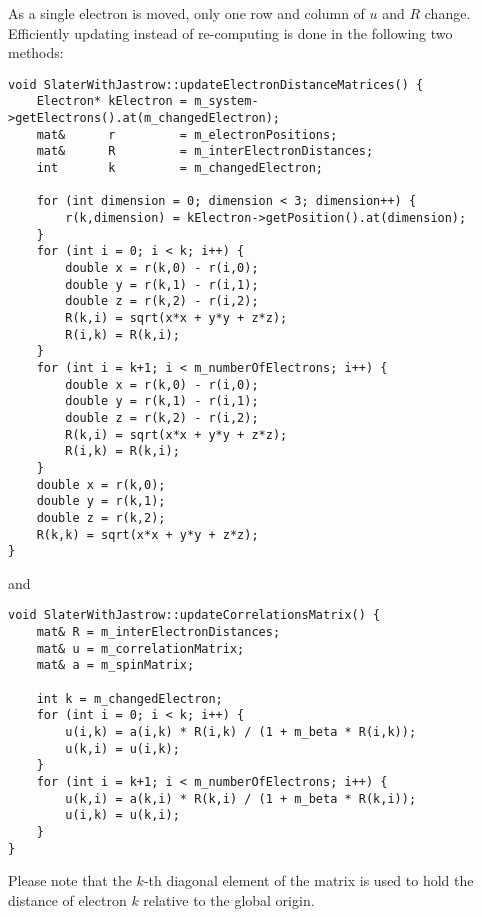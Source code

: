 \documentclass[../../master.tex]{subfiles}
\begin{document}
As a single electron is moved, only one row and column of $u$ and $R$ change. Efficiently updating instead of re-computing is done in the following two  methods:
\begin{lstlisting}[language={[std]c++}]
void SlaterWithJastrow::updateElectronDistanceMatrices() {
    Electron* kElectron = m_system->getElectrons().at(m_changedElectron);
    mat&      r         = m_electronPositions;
    mat&      R         = m_interElectronDistances;
    int       k         = m_changedElectron;

    for (int dimension = 0; dimension < 3; dimension++) {
        r(k,dimension) = kElectron->getPosition().at(dimension);
    }
    for (int i = 0; i < k; i++) {
        double x = r(k,0) - r(i,0);
        double y = r(k,1) - r(i,1);
        double z = r(k,2) - r(i,2);
        R(k,i) = sqrt(x*x + y*y + z*z);
        R(i,k) = R(k,i);
    }
    for (int i = k+1; i < m_numberOfElectrons; i++) {
        double x = r(k,0) - r(i,0);
        double y = r(k,1) - r(i,1);
        double z = r(k,2) - r(i,2);
        R(k,i) = sqrt(x*x + y*y + z*z);
        R(i,k) = R(k,i);
    }
    double x = r(k,0);
    double y = r(k,1);
    double z = r(k,2);
    R(k,k) = sqrt(x*x + y*y + z*z);
}
\end{lstlisting}
and
\begin{lstlisting}[language={[std]c++}]
void SlaterWithJastrow::updateCorrelationsMatrix() {
    mat& R = m_interElectronDistances;
    mat& u = m_correlationMatrix;
    mat& a = m_spinMatrix;

    int k = m_changedElectron;
    for (int i = 0; i < k; i++) {
        u(i,k) = a(i,k) * R(i,k) / (1 + m_beta * R(i,k));
        u(k,i) = u(i,k);
    }
    for (int i = k+1; i < m_numberOfElectrons; i++) {
        u(k,i) = a(k,i) * R(k,i) / (1 + m_beta * R(k,i));
        u(i,k) = u(k,i);
    }
}
\end{lstlisting}
Please note that the $k$-th diagonal element of the  matrix is used to hold the distance of electron $k$ relative to the global origin. 
\end{document}
